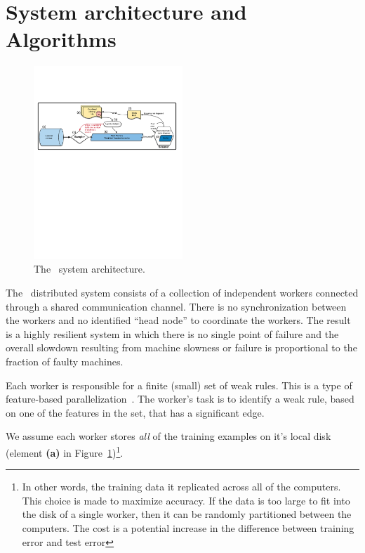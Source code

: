 \section{System architecture and Algorithms} \label{sec:Algorithms}

\begin{figure}
\centering
    \includegraphics[width=0.5\textwidth]{figs/SingleMachine.pdf}
    \caption{The \Sparrow\ system architecture.}\label{fig:architecture}
    \vspace{0pt}
\end{figure}

The \Sparrow\ distributed system consists of a collection of independent workers
connected through a shared communication channel. There is no
synchronization between the workers and no identified ``head node'' to
coordinate the workers. The result is a highly resilient system in which
there is no single point of failure and the overall slowdown resulting
from machine slowness or failure is proportional to the fraction of
faulty machines.

Each worker is responsible for a finite (small) set of weak
rules. This is a type of feature-based
parallelization~\cite{caragea_framework_2004}. The worker's task is to
identify a weak rule, based on one of the features in the set, that has
a significant edge.

We assume each worker stores {\em all} of the training examples
on it's local disk (element {\bf (a)} in Figure~\ref{fig:architecture})\footnote{In other
  words, the training data it replicated across all of the
  computers. This choice is made to maximize accuracy. If the data is
  too large to fit into the disk of a single worker, then it can be
  randomly partitioned between the computers. The cost is a potential increase
  in the difference between training error and test error}.

